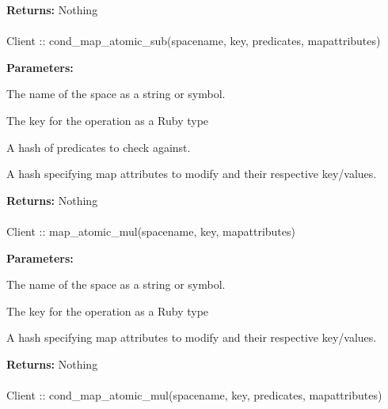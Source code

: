 \noindent\textbf{Returns:}
Nothing

\paragraph{}
\begin{ccode}
Client :: cond_map_atomic_sub(spacename, key, predicates, mapattributes)
\end{ccode}
\funcdesc 

\noindent\textbf{Parameters:}
\begin{description}[labelindent=\widthof{{mapattributes}},leftmargin=*,noitemsep,nolistsep,align=right]
\item[spacename] The name of the space as a string or symbol.
\item[key] The key for the operation as a Ruby type
\item[predicates] A hash of predicates to check against.
\item[mapattributes] A hash specifying map attributes to modify and their respective key/values.
\end{description}

\noindent\textbf{Returns:}
Nothing

\paragraph{}
\begin{ccode}
Client :: map_atomic_mul(spacename, key, mapattributes)
\end{ccode}
\funcdesc 

\noindent\textbf{Parameters:}
\begin{description}[labelindent=\widthof{{mapattributes}},leftmargin=*,noitemsep,nolistsep,align=right]
\item[spacename] The name of the space as a string or symbol.
\item[key] The key for the operation as a Ruby type
\item[mapattributes] A hash specifying map attributes to modify and their respective key/values.
\end{description}

\noindent\textbf{Returns:}
Nothing

\paragraph{}
\begin{ccode}
Client :: cond_map_atomic_mul(spacename, key, predicates, mapattributes)
\end{ccode}
\funcdesc 

